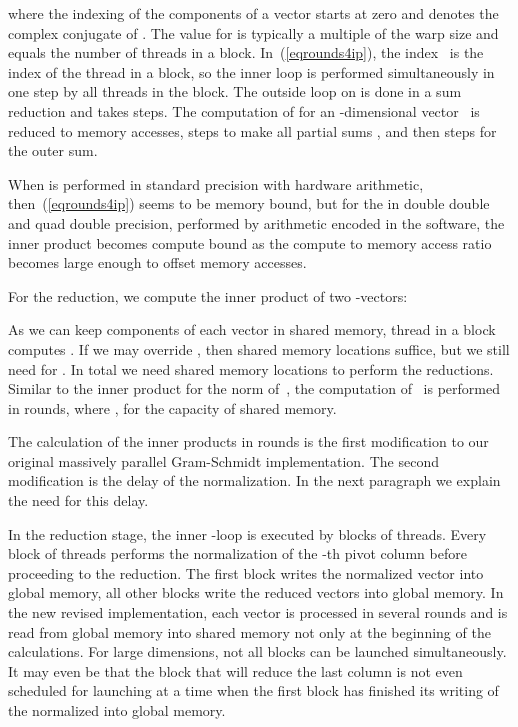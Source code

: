 \documentclass{article}
\begin{document}
where the indexing of the components of a vector starts at zero
and  denotes the complex conjugate of .
The value for  is typically a multiple of the warp size
and equals the number of threads in a block.
In~(\ref{eqrounds4ip}), the index~ is the index of the thread
in a block, so the inner loop is performed simultaneously in one step
by all threads in the block.  The outside loop on  is done in
a sum reduction and takes  steps.
The computation of  for an -dimensional vector~
is reduced to  memory accesses,  steps to make all partial sums
,
and then  steps for the outer sum.

When  is performed in standard precision with hardware arithmetic,
then~(\ref{eqrounds4ip}) seems to be memory bound,
but for the  in double double and quad double precision,
performed by arithmetic encoded in the software, the inner product
becomes compute bound as the compute to memory access ratio becomes
large enough to offset memory accesses.

For the reduction, we compute the inner product
 of two -vectors:



As we can keep  components of each vector in shared memory,
thread  in a block computes .
If we may override , then  shared memory locations suffice,
but we still need  for .
In total we need  shared memory locations to perform the reductions.
Similar to the inner product for the norm of~,
the computation of~ is performed in  rounds,
where , for the capacity  of shared memory.

The calculation of the inner products in  rounds is the first
modification to our original massively parallel Gram-Schmidt implementation.
The second modification is the delay of the normalization.
In the next paragraph we explain the need for this delay.

In the reduction stage, the inner -loop is executed by  blocks
of threads.  Every block of threads performs the normalization of the
-th pivot column before proceeding to the reduction.
The first block writes the normalized vector into global memory,
all other blocks write the reduced vectors into global memory.
In the new revised implementation, each vector is processed in
several rounds and is read from global memory into shared memory
not only at the beginning of the calculations.
For large dimensions, not all blocks can be launched simultaneously.
It may even be that the block that will reduce the last column
is not even scheduled for launching at a time when the first block
has finished its writing of the normalized  into global memory.
\end{document}
